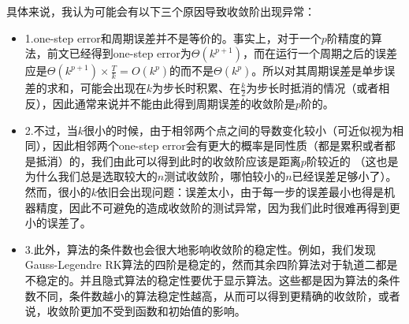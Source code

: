 \documentclass{ctexart}
\begin{document}
\begin{sloppypar}
具体来说，我认为可能会有以下三个原因导致收敛阶出现异常：
\begin{itemize}
    \item 1.one-step error和周期误差并不是等价的。事实上，对于一个$p$阶精度的算法，前文已经得到one-step error为$\Theta(k^{p+1})$，而在运行一个周期之后的误差应是$\Theta(k^{p+1}) \times \frac{T}{k} = O(k^p)$的而不是$\Theta(k^{p})$。所以对其周期误差是单步误差的求和，可能会出现在$k$为步长时积累、在$\frac{k}{2}$为步长时抵消的情况（或者相反），因此通常来说并不能由此得到周期误差的收敛阶是$p$阶的。
    \item 2.不过，当$k$很小的时候，由于相邻两个点之间的导数变化较小（可近似视为相同），因此相邻两个one-step error会有更大的概率是同性质（都是累积或者都是抵消）的，我们由此可以得到此时的收敛阶应该是距离$p$阶较近的
    （这也是为什么我们总是选取较大的$n$测试收敛阶，哪怕较小的$n$已经误差足够小了）。然而，很小的$k$依旧会出现问题：误差太小，由于每一步的误差最小也得是机器精度，因此不可避免的造成收敛阶的测试异常，因为我们此时很难再得到更小的误差了。
    \item 3.此外，算法的条件数也会很大地影响收敛阶的稳定性。例如，我们发现Gauss-Legendre RK算法的四阶是稳定的，然而其余四阶算法对于轨道二都是不稳定的。并且隐式算法的稳定性要优于显示算法。这些都是因为算法的条件数不同，条件数越小的算法稳定性越高，从而可以得到更精确的收敛阶，或者说，收敛阶更加不受到函数和初始值的影响。

\end{itemize}


\end{sloppypar}
\end{document}
